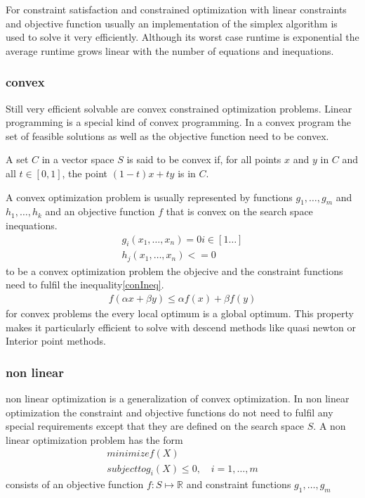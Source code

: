 For constraint satisfaction and constrained optimization with linear constraints and objective function usually an implementation of the simplex algorithm\cite{dantzig63Simplex} is used to solve it very efficiently. Although its worst case runtime is exponential the average runtime grows linear with the number of equations and inequations.

\subsubsection{convex}
Still very efficient solvable are convex constrained optimization problems. Linear programming is a special kind of convex programming. In a convex program the set of feasible solutions as well as the objective function need to be convex.
\begin{definition}
A set $C$ in a vector space $S$ is said to be convex if, for all points $x$ and $y$ in $C$ and all $t\in\left[0,1\right]$, the point
$(1 − t ) x + t y$ is in $C$.
\end{definition}
A convex optimization problem is usually represented by functions $g_1,\dots,g_m$ and $h_1,\dots,h_k$ and an objective function $f$ that is convex on the search space inequations.
\begin{eqnarray}
g_i(x_1,\dots,x_n)=0 i\in\left[1\dots \right]\\
h_j(x_1,\dots,x_n)<=0
\end{eqnarray}
to be a convex optimization problem the objecive  and the constraint functions need to fulfil the inequality\ref{conIneq}.\cite{Boyd04ConOpt}
\begin{eqnarray}
\label{conIneq}
f(\alpha x + \beta y)\leq \alpha f(x)+ \beta f(y)
\end{eqnarray}
for convex problems the every local optimum is a global optimum. This property makes it particularly efficient to solve with descend methods like quasi newton or Interior point methods.
\subsubsection{non linear}
non linear optimization is a generalization of convex optimization. In non linear optimization the constraint and objective functions do not need to fulfil any special requirements except that they are defined on the search space $S$.
A non linear optimization problem has the form
\begin{eqnarray}
minimize f(X)\\
subject to g_i(X)\leq 0, \quad i=1,\dots , m
\end{eqnarray} consists of an objective function $f:S\mapsto\mathbb{R}$ and constraint functions $g_1,\dots ,g_m$

